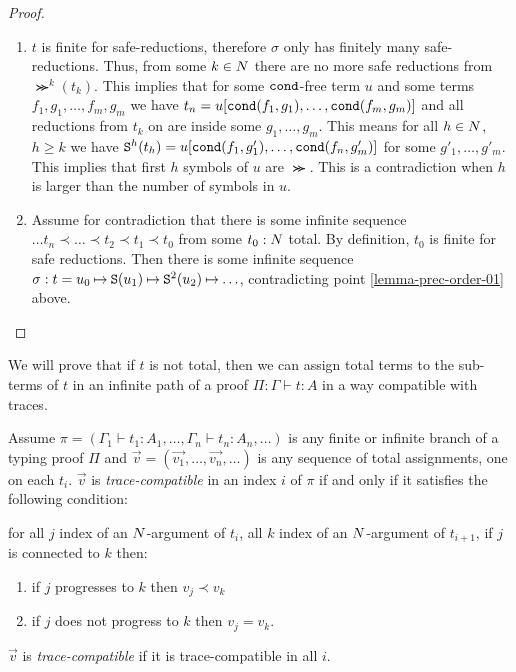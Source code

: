 \begin{proof}
\begin{enumerate}
\item
$t$ is finite for safe-reductions, therefore
$\sigma$ only has finitely many safe-reductions. 
Thus, from some $k\in{N}$ there are no more safe reductions from
$\Succ^k(t_k)$. This implies that for some ${\tt cond}$-free term 
$u$ and some terms $f_1, g_1, \ldots, f_m, g_m$ we have
$t_n = u[{\tt cond}(f_1,g_1), \ldots, {\tt cond}(f_m,g_m)]$ and all reductions from $t_k$ on are inside
some $g_1, \ldots, g_m$. This means for all $h \in {N}$, $h \ge k$ we  have
${\tt S}^{h}(t_{h}) =  u[{\tt cond}(f_1,g'_1), \ldots, {\tt cond}(f_n,g'_m)]$ for some 
$g'_1, \ldots, g'_m$. This implies that first $h$ symbols of $u$ are $\Succ$.
This is a contradiction when $h$ is larger than the number of symbols in $u$.

\item
Assume for contradiction that there is some infinite sequence
$\ldots t_n \prec \ldots \prec t_2 \prec t_1 \prec t_0$
from some $t_0:{N}$ total. By definition, $t_0$ is finite for safe reductions.
Then there is some infinite sequence 
$\sigma: t = u_0 \mathbin{\mapsto} {\tt S}(u_1) \mathbin{\mapsto} {\tt S}^2(u_2) \mathbin{\mapsto} \ldots$,
contradicting point \ref{lemma-prec-order-01} above.
\end{enumerate}
\end{proof}


We will prove that if $t$ is not total, then we can assign total terms to  the sub-terms of $t$
in an infinite path of a proof $\Pi : \Gamma \vdash t: A$ in a way compatible with traces.


\begin{definition}
\label{definition-trace-compatible}
Assume $\pi  = (\Gamma_1 \vdash t_1:A_1, \ldots, \Gamma_n \vdash t_n:A_n, \ldots)$ 
is any finite or infinite branch of a typing proof $\Pi$
and $\vec{v} = (\vec{v_1}, \ldots, \vec{v_n}, \ldots)$ 
is any sequence of total assignments, one on each $t_i$. 
$\vec{v}$ is \emph{trace-compatible} in an index $i$ of $\pi$  
if and only if it satisfies the following condition:

  for all $j$  index of an ${N}$-argument of $t_i$, 
  all $k$ index of an ${N}$-argument of $t_{i+1}$, 
  if $j$ is connected to $k$ then:
 \begin{enumerate}
 \item
 if $j$ progresses to $k$ then $v_j \prec v_k$ 
 \item
 if $j$ does not progress to $k$ then $v_j = v_k$.
 \end{enumerate}
$\vec{v}$ is \emph{trace-compatible} if it is trace-compatible in all $i$.
\end{definition}

